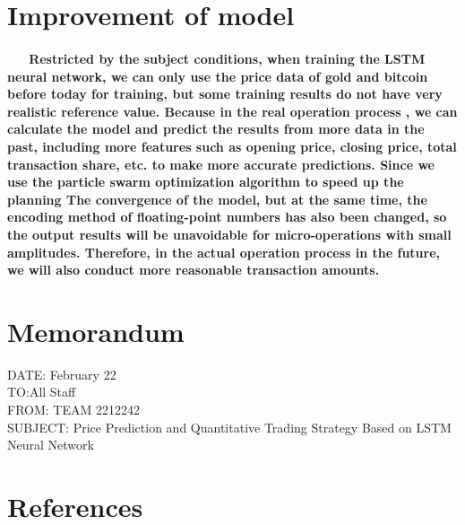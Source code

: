 \documentclass{mcmthesis}
\begin{document}
	\section{Improvement of model}
	\paragraph{\ \ \ Restricted by the subject conditions, when training the LSTM neural network, we can only use the price data of gold and bitcoin before today for training, but some training results do not have very realistic reference value. Because in the real operation process , we can calculate the model and predict the results from more data in the past, including more features such as opening price, closing price, total transaction share, etc. to make more accurate predictions. Since we use the particle swarm optimization algorithm to speed up the planning The convergence of the model, but at the same time, the encoding method of floating-point numbers has also been changed, so the output results will be unavoidable for micro-operations with small amplitudes. Therefore, in the actual operation process in the future, we will also conduct more reasonable transaction amounts. }
	
	\newpage
	\section{Memorandum}
	DATE: February 22\\
	TO:All Staff\\
	FROM: TEAM 2212242\\
	SUBJECT: Price Prediction and Quantitative Trading Strategy Based on LSTM Neural Network\\
	
	
	\newpage
	\section{References}
	
	
	
	
	
	
	
	
	\newpage
	\begin{appendices}
		\section{ }
		


	\end{appendices}
\end{document}
